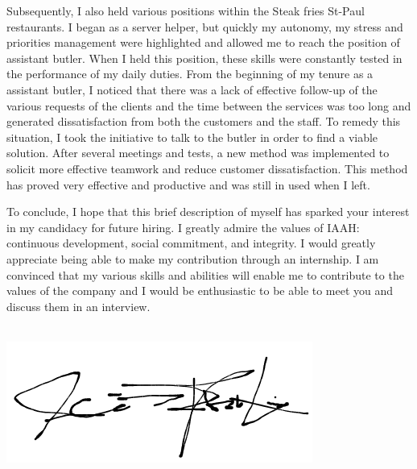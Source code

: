 \documentclass{article}
\begin{document}
\begin{textblock}{11.35}
Subsequently, I also held various positions within the Steak fries St-Paul restaurants. I began as a server helper, but quickly my autonomy, my stress and priorities management were highlighted and allowed me to reach the position of assistant butler. When I held this position, these skills were constantly tested in the performance of my daily duties. From the beginning of my tenure as a assistant butler, I noticed that there was a lack of effective follow-up of the various requests of the clients and the time between the services was too long and generated dissatisfaction from both the customers and the staff. To remedy this situation, I took the initiative to talk to the butler in order to find a viable solution. After several meetings and tests, a new method was implemented to solicit more effective teamwork and reduce customer dissatisfaction. This method has proved very effective and productive and was still in used when I left. \newline

To conclude, I hope that this brief description of myself has sparked your interest in my candidacy for future hiring. I greatly admire the values of IAAH: continuous development, social commitment, and integrity. I would greatly appreciate being able to make my contribution through an internship. I am convinced that my various skills and abilities will enable me to contribute to the values of the company and I would be enthusiastic to be able to meet you and discuss them in an interview.\newline

\textcolor{black}{} \\

\includegraphics[height=5\baselineskip]{signature.png}


\end{textblock}
\end{document}
